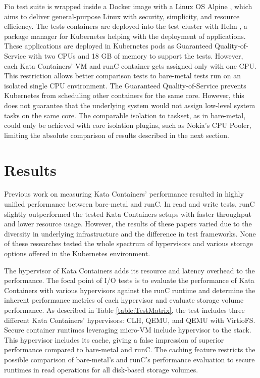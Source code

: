 Fio test suite is wrapped inside a Docker image with a Linux OS Alpine \cite{Alpine}, which aims to deliver general-purpose Linux with security, simplicity, and resource efficiency. The tests containers are deployed into the test cluster with Helm \cite{Helm}, a package manager for Kubernetes helping with the deployment of applications. These applications are deployed in Kubernetes pods as Guaranteed Quality-of-Service \cite{QOSKubernetes} with two CPUs and 18 GB of memory to support the tests. However, each Kata Containers' VM and runC container gets assigned only with one CPU. This restriction allows better comparison tests to bare-metal tests run on an isolated single CPU environment. The Guaranteed Quality-of-Service prevents Kubernetes from scheduling other containers for the same core. However, this does not guarantee that the underlying system would not assign low-level system tasks on the same core. The comparable isolation to taskset, as in bare-metal, could only be achieved with core isolation plugins, such as Nokia's CPU Pooler, limiting the absolute comparison of results described in the next section.

\section{Results}

Previous work \cite{EverartsdeVelp2020}\cite{Kumar2020}\cite{StackHPCKata}\cite{Randazzo2019} on measuring Kata Containers' performance resulted in highly unified performance between bare-metal and runC. In read and write tests, runC slightly outperformed the tested Kata Containers setups with faster throughput and lower resource usage. However, the results of these papers varied due to the diversity in underlying infrastructure and the difference in test frameworks. None of these researches tested the whole spectrum of hypervisors and various storage options offered in the Kubernetes environment.

The hypervisor of Kata Containers adds its resource and latency overhead to the performance. The focal point of I/O tests is to evaluate the performance of Kata Containers with various hypervisors against the runC runtime and determine the inherent performance metrics of each hypervisor and evaluate storage volume performance. As described in Table \ref{table:TestMatrix}, the test includes three different Kata Containers' hypervisors: CLH, QEMU, and QEMU with VirtioFS. Secure container runtimes leveraging micro-VM include hypervisor to the stack. This hypervisor includes its cache, giving a false impression of superior performance compared to bare-metal and runC. The caching feature restricts the possible comparison of bare-metal's and runC's performance evaluation to secure runtimes in read operations for all disk-based storage volumes.


